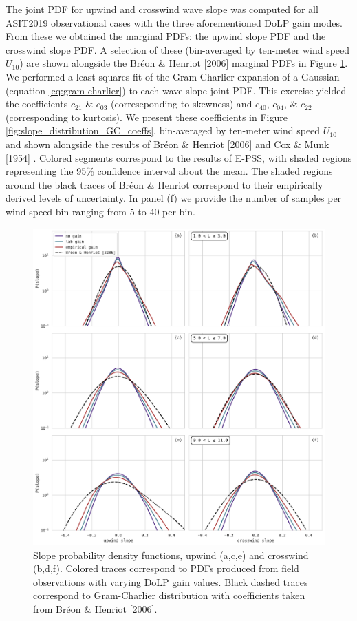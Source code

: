 \documentclass[letterpaper,journal]{IEEEtran}
\begin{document}
The joint PDF for upwind and crosswind wave slope was computed for all ASIT2019 observational cases with the three aforementioned DoLP gain modes. From these we obtained the marginal PDFs: the upwind slope PDF and the crosswind slope PDF. A selection of these (bin-averaged by ten-meter wind speed $U_{10}$) are shown alongside the Br\'eon \& Henriot [2006] \cite{Breon2006} marginal PDFs in Figure \ref{fig:slope_distributions_binned_by_wind}. We performed a least-squares fit of the Gram-Charlier expansion of a Gaussian (equation \ref{eq:gram-charlier}) to each wave slope joint PDF. This exercise yielded the coefficients $c_{21}$ \& $c_{03}$ (correseponding to skewness) and $c_{40}$, $c_{04}$, \& $c_{22}$ (corresponding to kurtosis). We present these coefficients in Figure \ref{fig:slope_distribution_GC_coeffs}, bin-averaged by ten-meter wind speed $U_{10}$ and shown alongside the results of Br\'eon \& Henriot [2006] \cite{Breon2006} and Cox \& Munk [1954] \cite{Cox1954a}. Colored segments correspond to the results of E-PSS, with shaded regions representing the 95\% confidence interval about the mean. The shaded regions around the black traces of Br\'eon \& Henriot correspond to their empirically derived levels of uncertainty. In panel (f) we provide the number of samples per wind speed bin ranging from 5 to 40 per bin.

\begin{figure}[!ht]
    \centering
    \includegraphics[width=\textwidth]{_figures/slope_distributions_binned_by_wind.pdf}
    \vspace{-20pt}
\caption{Slope probability density functions, upwind (a,c,e) and crosswind (b,d,f). Colored traces correspond to PDFs produced from field observations with varying DoLP gain values. Black dashed traces correspond to Gram-Charlier distribution with coefficients taken from Br\'eon \& Henriot [2006].}
\label{fig:slope_distributions_binned_by_wind}
\end{figure}
\end{document}
